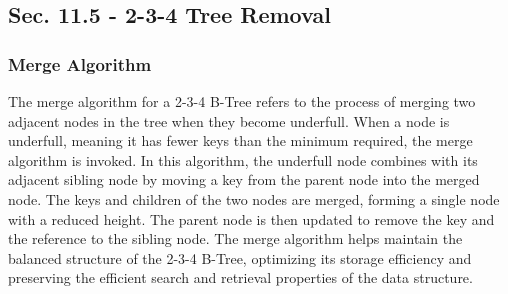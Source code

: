 \subsection*{Sec. 11.5 - 2-3-4 Tree Removal}

\subsubsection{Merge Algorithm}

The merge algorithm for a 2-3-4 B-Tree refers to the process of merging two adjacent nodes in the tree when they become underfull. When a node is underfull, meaning it has fewer keys than the minimum required, the merge algorithm is invoked. In this algorithm, the underfull node combines with its adjacent sibling node by moving a 
key from the parent node into the merged node. The keys and children of the two nodes are merged, forming a single node with a reduced height. The parent node is then updated to remove the key and the reference to the sibling node. The merge algorithm helps maintain the balanced structure of the 2-3-4 B-Tree, optimizing its storage 
efficiency and preserving the efficient search and retrieval properties of the data structure.

